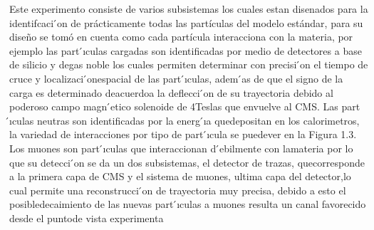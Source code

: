  Este experimento consiste de varios subsistemas los cuales estan disenados para la identifcaci ́on de prácticamente todas las partículas del modelo estándar, para su dise\~no se tomó en cuenta como cada partícula interacciona con la materia, por ejemplo las part ́ıculas cargadas son identificadas por medio de detectores a base de silicio y degas noble los cuales permiten determinar con precisi ́on el tiempo de cruce y localizaci ́onespacial de las part ́ıculas, adem ́as de que el signo de la carga es determinado deacuerdoa la deflecci ́on de su trayectoria debido al poderoso campo magn ́etico solenoide de 4Teslas que envuelve al CMS. Las part ́ıculas neutras son identificadas por la energ ́ıa quedepositan en los calorimetros, la variedad de interacciones por tipo de part ́ıcula se puedever en la Figura 1.3. Los muones son part ́ıculas que interaccionan d ́ebilmente con lamateria por lo que su detecci ́on se da un dos subsistemas, el detector de trazas, quecorresponde a la primera capa de CMS y el sistema de muones, ultima capa del detector,lo cual permite una reconstrucci ́on de trayectoria muy precisa, debido a esto el posibledecaimiento de las nuevas part ́ıculas a muones resulta un canal favorecido desde el puntode vista experimenta